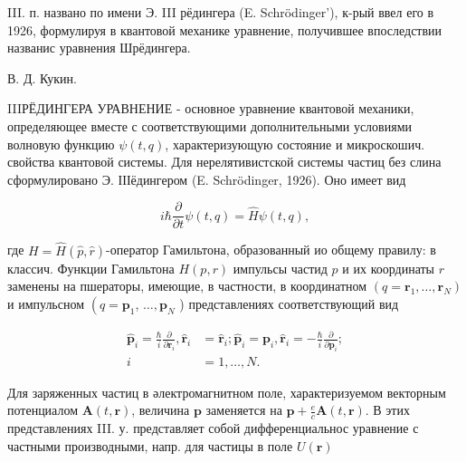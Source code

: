\documentclass[10pt]{article}
\begin{document}
III. п. названо по имени Э. III рёдингера (E. Schrödinger'), к-рый ввел его в 1926, формулируя в квантовой механике уравнение, получившее впоследствии названис уравнения Шрёдингера.



В. Д. Кукин.



IIIРЁДИНГЕРА УРАВНЕНИЕ - основное уравнение квантовой механики, определяющее вместе с соответствующими дополнительными условиями волновую функцию $\psi(t, q)$, характеризующую состояние и микроскошич. свойства квантовой системы. Для нерелятивистской системы частиц без слина сформулировано Э. ІІІёдингером (E. Schrödinger, 1926). Оно имеет вид



\[

i \hbar \frac{\partial}{\partial t} \psi(t, q)=\widehat{H} \psi(t, q),

\]



где $H=\hat{H}(\hat{p}, \hat{r})$-оператор Гамильтона, образованный ио общему правилу: в классич. Функции Гамильтона $H(p, r)$ импульсы частид $p$ и их координаты $r$ заменены на пшераторы, имеющие, в частности, в координатном $\left(q=\boldsymbol{r}_{1}, \ldots, \boldsymbol{r}_{N}\right)$ и импульсном $\left(q=\boldsymbol{p}_{1}\right.$, $\ldots, \boldsymbol{p}_{N}$ ) представлениях соответствующий вид



\[

\begin{aligned}

\hat{\boldsymbol{p}}_{i}=\frac{\hbar}{i} \frac{\partial}{\partial \boldsymbol{r}_{i}}, \hat{\boldsymbol{r}}_{i} & =\hat{\boldsymbol{r}}_{i} ; \hat{\boldsymbol{p}}_{i}=\boldsymbol{p}_{i}, \hat{\boldsymbol{r}}_{i}=-\frac{\hbar}{i} \frac{\partial}{\partial \boldsymbol{p}_{i}} ; \\

i & =1, \ldots, N .

\end{aligned}

\]



Для заряженных частиц в әлектромагнитном поле, характеризуемом векторным потенциалом $\boldsymbol{A}(t, \boldsymbol{r})$, величина $\boldsymbol{p}$ заменяется на $\boldsymbol{p}+\frac{e}{c} \boldsymbol{A}(t, \boldsymbol{r})$. В этих представлениях III. у. представляет собой дифференциальнос уравнение с частными производными, напр. для частицы в поле $U(\boldsymbol{r})$
\end{document}
